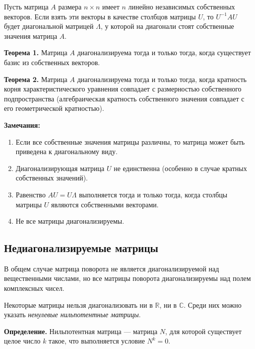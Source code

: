 \documentclass[11pt,a4paper]{article}
\begin{document}
Пусть матрица \(A\) размера \(n \times n\) имеет \(n\) линейно
независимых собственных векторов. Если взять эти векторы в качестве
столбцов матрицы \(U\), то \(U^{-1}AU\) будет диагональной матрицей
\(\Lambda\), у которой на диагонали стоят собственные значения матрица
\(A\).

\textbf{Теорема 1.} Матрица \(A\) диагонализируема тогда и только тогда,
когда существует базис из собственных векторов.

\textbf{Теорема 2.} Матрица \(A\) диагонализируема тогда и только тогда,
когда кратность корня характеристического уравнения совпадает с
размерностью собственного подпространства (алгебраическая кратность
собственного значения совпадает с его геометрической кратностью).

\textbf{Замечания:}
\begin{enumerate}
  \item Если все собственные значения матрицы различны,
то матрица может быть приведена к диагональному виду.
  \item Диагонализирующая матрица \(U\) не единственна (особенно в случае кратных
собственных значений).
  \item Равенство \(AU = U\Lambda\) выполняется тогда и
только тогда, когда столбцы матрицы \(U\) являются собственными
векторами.
  \item Не все матрицы диагонализируемы.
\end{enumerate}

    \hypertarget{ux43dux435ux434ux438ux430ux433ux43eux43dux430ux43bux438ux437ux438ux440ux443ux435ux43cux44bux435-ux43cux430ux442ux440ux438ux446ux44b}{%
\subsection{Недиагонализируемые
матрицы}\label{ux43dux435ux434ux438ux430ux433ux43eux43dux430ux43bux438ux437ux438ux440ux443ux435ux43cux44bux435-ux43cux430ux442ux440ux438ux446ux44b}}

В общем случае матрица поворота не является диагонализируемой над
вещественными числами, но все матрицы поворота диагонализируемы над
полем комплексных чисел.

Некоторые матрицы нельзя диагонализовать ни в \(\mathbb{R}\), ни в
\(\mathbb{C}\). Среди них можно указать \emph{ненулевые нильпотентные
матрицы}.

\textbf{Определение.} Нильпотентная матрица --- матрица \(N\), для
которой существует целое число \(k\) такое, что выполняется условие
\(N^k=0\).
\end{document}
